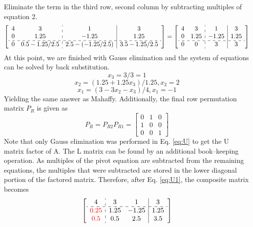 \documentclass[12pt]{article}   %
\begin{document}
Eliminate the term in the third row, second column by subtracting multiples of equation 2.
\begin{equation}
\left[
\begin{array}{cc:c|c}
4 & 3 & 1 & 3 \\
0 & 1.25 & -1.25 & 1.25 \\
\hdashline
0 & 0.5-1.25/2.5 & 2.5-(-1.25/2.5) & 3.5-1.25/2.5 
\end{array}
\right]=
\left[
\begin{array}{cc:c|c}
4 & 3 & 1 & 3 \\
0 & 1.25 & -1.25 & 1.25 \\
\hdashline
0 & 0 & 3 & 3 
\end{array}
\right]
\label{eq:U}
\end{equation}
At this point, we are finished with Gauss elimination and the system of equations can be solved by back substitution.
\begin{equation}
x_3=3/3=1
\end{equation}
\begin{equation}
x_2 = (1.25 +1.25 x_3)/1.25, x_2=2
\end{equation}
\begin{equation}
x_1 = (3 -3x_2-x_3)/4, x_1=-1
\end{equation}
Yielding the same answer as Mahaffy. Additionally, the final row permutation matrix $P_R$ is given as
\begin{equation}
P_R=P_{R2}P_{R1}=\begin{bmatrix}
0 & 1 & 0\\
1 & 0 & 0\\
0 & 0 & 1
\end{bmatrix}
\end{equation}
Note that only Gauss elimination was performed in Eq. \ref{eq:U} to get the U matrix factor of A. The L matrix can be found by an additional book--keeping operation. As multiples of the pivot equation are subtracted from the remaining equations, the multiples that were subtracted are stored in the lower diagonal portion of the factored matrix. Therefore, after Eq. \ref{eq:U1}, the composite matrix becomes
\begin{equation}
\left[
\begin{array}{c:cc|c}
4 & 3 & 1 & 3 \\
\hdashline
{\color{red}0.25} & 1.25 & -1.25 & 1.25 \\
{\color{red}0.5} & 0.5 & 2.5 & 3.5
\end{array}
\right]
\end{equation}
\end{document}
